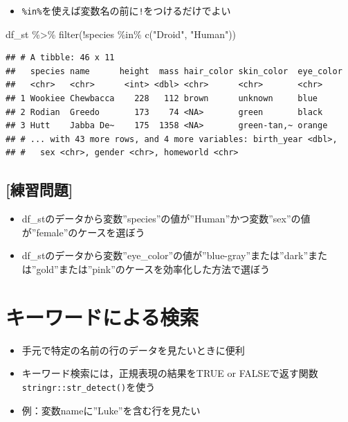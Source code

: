\documentclass[
  xelatex,ja=standard, b5paper]{bxjsbook}
\newenvironment{Shaded}{\begin{snugshade}}{\end{snugshade}}
\newcommand{\FunctionTok}[1]{\textcolor[rgb]{0.00,0.00,0.00}{#1}}
\newcommand{\NormalTok}[1]{#1}
\newcommand{\SpecialCharTok}[1]{\textcolor[rgb]{0.00,0.00,0.00}{#1}}
\newcommand{\StringTok}[1]{\textcolor[rgb]{0.31,0.60,0.02}{#1}}
\providecommand{\tightlist}{%
  \setlength{\itemsep}{0pt}\setlength{\parskip}{0pt}}
\begin{document}
\begin{itemize}
\tightlist
\item
  \texttt{\%in\%}を使えば変数名の前に\texttt{!}をつけるだけでよい
\end{itemize}

\begin{Shaded}
\begin{Highlighting}[]
\NormalTok{df\_st }\SpecialCharTok{\%\textgreater{}\%} 
  \FunctionTok{filter}\NormalTok{(}\SpecialCharTok{!}\NormalTok{species }\SpecialCharTok{\%in\%} \FunctionTok{c}\NormalTok{(}\StringTok{"Droid"}\NormalTok{, }\StringTok{"Human"}\NormalTok{))}
\end{Highlighting}
\end{Shaded}

\begin{verbatim}
## # A tibble: 46 x 11
##   species name      height  mass hair_color skin_color  eye_color
##   <chr>   <chr>      <int> <dbl> <chr>      <chr>       <chr>    
## 1 Wookiee Chewbacca    228   112 brown      unknown     blue     
## 2 Rodian  Greedo       173    74 <NA>       green       black    
## 3 Hutt    Jabba De~    175  1358 <NA>       green-tan,~ orange   
## # ... with 43 more rows, and 4 more variables: birth_year <dbl>,
## #   sex <chr>, gender <chr>, homeworld <chr>
\end{verbatim}

\hypertarget{ux7df4ux7fd2ux554fux984c-7}{%
\subsection{{[}練習問題{]}}\label{ux7df4ux7fd2ux554fux984c-7}}

\begin{itemize}
\tightlist
\item
  df\_stのデータから変数''species''の値が''Human''かつ変数''sex''の値が''female''のケースを選ぼう
\item
  df\_stのデータから変数''eye\_color''の値が''blue-gray''または''dark''または''gold''または''pink''のケースを効率化した方法で選ぼう
\end{itemize}

\hypertarget{filter-kw}{%
\section{キーワードによる検索}\label{filter-kw}}

\begin{itemize}
\item
  手元で特定の名前の行のデータを見たいときに便利
\item
  キーワード検索には，正規表現の結果をTRUE or FALSEで返す関数\texttt{stringr::str\_detect()}を使う
\item
  例：変数nameに''Luke''を含む行を見たい
\end{itemize}
\end{document}
